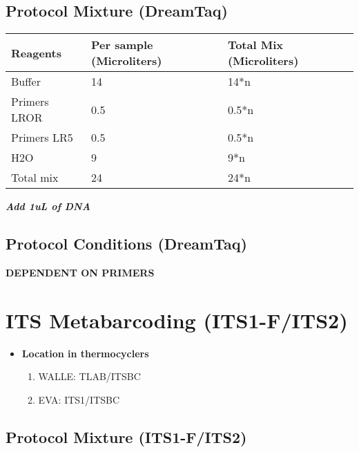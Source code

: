 \documentclass[
]{book}
\providecommand{\tightlist}{%
  \setlength{\itemsep}{0pt}\setlength{\parskip}{0pt}}
\begin{document}
\hypertarget{protocol-mixture-dreamtaq}{%
\subsection{Protocol Mixture (DreamTaq)}\label{protocol-mixture-dreamtaq}}

\begin{longtable}[]{@{}lll@{}}
\toprule
Reagents & Per sample (Microliters) & Total Mix (Microliters) \\
\midrule
\endhead
Buffer & 14 & 14*n \\
Primers LROR & 0.5 & 0.5*n \\
Primers LR5 & 0.5 & 0.5*n \\
H2O & 9 & 9*n \\
Total mix & 24 & 24*n \\
\bottomrule
\end{longtable}

\textbf{\emph{Add 1uL of DNA}}

\hypertarget{protocol-conditions-dreamtaq}{%
\subsection{Protocol Conditions (DreamTaq)}\label{protocol-conditions-dreamtaq}}

\textbf{DEPENDENT ON PRIMERS}

\hypertarget{its-metabarcoding-its1-fits2}{%
\section{ITS Metabarcoding (ITS1-F/ITS2)}\label{its-metabarcoding-its1-fits2}}

\begin{itemize}
\tightlist
\item
  \textbf{Location in thermocyclers}

  \begin{enumerate}
  \def\labelenumi{\arabic{enumi}.}
  \tightlist
  \item
    WALLE: TLAB/ITSBC
  \item
    EVA: ITS1/ITSBC
  \end{enumerate}
\end{itemize}

\hypertarget{protocol-mixture-its1-fits2}{%
\subsection{Protocol Mixture (ITS1-F/ITS2)}\label{protocol-mixture-its1-fits2}}
\end{document}
